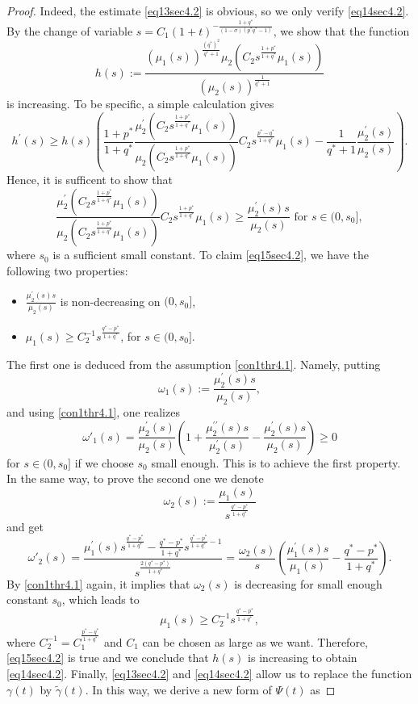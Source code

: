 \documentclass[11pt,reqno]{amsart}
\newcommand{\di}{\displaystyle}
\newcommand{\tron}[1]{\left( #1 \right)}
\numberwithin{equation}{section}
\theoremstyle{plain}
\begin{document}
\begin{proof}
Indeed, the estimate \eqref{eq13sec4.2} is obvious, so we only verify \eqref{eq14sec4.2}. By the change of variable $s= C_1(1+t)^{-\frac{1+q^*}{(1-\sigma)(p^*q^*-1)}}$, we show that the function
\[
h(s):=\frac{\tron{\mu_1(s)}^{\frac{(q^*)^2}{q^*+1}}\mu_2\tron{C_2s^{\frac{1+p^*}{1+q^*}}\mu_1(s)}}{\tron{\mu_2(s)}^{\frac{1}{q^*+1}}}
\]
is increasing. To be specific, a simple calculation gives
\[
h^{\prime}(s)\geq h(s)\tron{\frac{1+p^*}{1+q^*}\frac{\mu^{\prime}_2\tron{C_2s^{\frac{1+p^*}{1+q^*}}\mu_1(s)}}{\mu_2\tron{C_2s^{\frac{1+p^*}{1+q^*}}\mu_1(s)}}C_2s^{\frac{p^*-q^*}{1+q^*}}\mu_1(s)-\frac{1}{q^*+1}\frac{\mu^{\prime}_2(s)}{\mu_2(s)}}.
\]
Hence, it is sufficent to show that
\begin{equation}\label{eq15sec4.2}
    \frac{\mu^{\prime}_2\tron{C_2s^{\frac{1+p^*}{1+q^*}}\mu_1(s)}}{\mu_2\tron{C_2s^{\frac{1+p^*}{1+q^*}}\mu_1(s)}}C_2s^{\frac{1+p^*}{1+q^*}}\mu_1(s)\geq \frac{\mu^{\prime}_2(s)s}{\mu_2(s)}\text{ for $s\in (0,s_0]$},
\end{equation}
where $s_0$ is a sufficient small constant. To claim \eqref{eq15sec4.2}, we have the following two properties:
\begin{itemize}
    \item $\di\frac{\mu^{\prime}_2(s)s}{\mu_2(s)}$ is non-decreasing on $(0,s_0]$,
    \item $\di \mu_1(s)\geq C^{-1}_2s^{\frac{q^*-p^*}{1+q^*}}$, for $s\in (0,s_0]$.
\end{itemize}
The first one is deduced from the assumption \eqref{con1thr4.1}. Namely, putting 
\[
\omega_1(s):=\di\frac{\mu^{\prime}_2(s)s}{\mu_2(s)},
\]
and using \eqref{con1thr4.1}, one realizes
\[
\omega'_1(s)=\frac{\mu^{\prime}_2(s)}{\mu_2(s)}\tron{1+\frac{\mu^{\prime\prime}_2(s)s}{\mu^{\prime}_2(s)}-\frac{\mu^{\prime}_2(s)s}{\mu_2(s)}}\geq 0
\]
for $s\in (0,s_0]$ if we choose $s_0$ small enough. This is to achieve the first property. In the same way, to prove the second one we denote
\[
\omega_2(s):=\frac{\mu_1(s)}{s^{\frac{q^*-p^*}{1+q^*}}}
\]
and get
\[
\omega'_2(s)=\frac{\mu^{\prime}_1(s)s^{\frac{q^*-p^*}{1+q^*}}-\frac{q^*-p^*}{1+q^*}s^{\frac{q^*-p^*}{1+q^*}-1}}{s^{\frac{2(q^*-p^*)}{1+q^*}}}=\frac{\omega_2(s)}{s}\tron{\frac{\mu^{\prime}_1(s)s}{\mu_1(s)}-\frac{q^*-p^*}{1+q^*}}.
\]
By \eqref{con1thr4.1} again, it implies that $\omega_2(s)$ is decreasing for small enough constant $s_0$, which leads to 
\[
\mu_1(s)\geq C^{-1}_2s^{\frac{q^*-p^*}{1+q^*}},
\] 
where $C^{-1}_2=C_1^{\frac{p^*-q^*}{1+q^*}}$ and $C_1$ can be chosen as large as we want. Therefore, \eqref{eq15sec4.2} is true and we conclude that $h(s)$ is increasing to obtain \eqref{eq14sec4.2}. Finally, \eqref{eq13sec4.2} and \eqref{eq14sec4.2} allow us to replace the function $\gamma(t)$ by $\tilde{\gamma}(t)$. In this way, we derive a new form of $\Psi(t)$ as

\end{proof}
\end{document}

